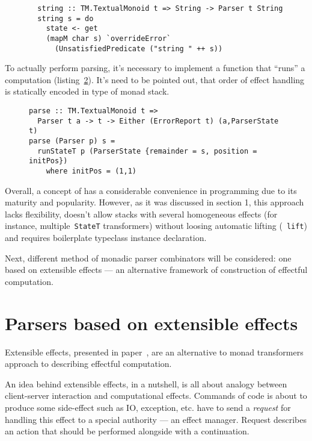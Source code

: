  \begin{figure}[h]
  \begin{lstlisting}
  string :: TM.TextualMonoid t => String -> Parser t String
  string s = do
    state <- get
    (mapM char s) `overrideError`
      (UnsatisfiedPredicate ("string " ++ s))
  \end{lstlisting}
  \caption{}
  \label{listing:mtlParserString}
  \end{figure}  

  To actually perform parsing, it's necessary to implement a function that 
  ``runs'' a computation (listing~\ref{listing:mtlParseRun}). It's need to be
  pointed out, that order of effect handling is statically encoded in type of 
  monad stack. 

  \begin{figure}[h]
  \begin{lstlisting}
parse :: TM.TextualMonoid t =>
  Parser t a -> t -> Either (ErrorReport t) (a,ParserState t)
parse (Parser p) s =
  runStateT p (ParserState {remainder = s, position = initPos})
    where initPos = (1,1)
  \end{lstlisting}
  \caption{}
  \label{listing:mtlParseRun}
  \end{figure}

  Overall, a concept of has a considerable convenience in programming due to 
  its maturity and popularity. However, as it was discussed in section 1, this 
  approach lacks flexibility, doesn't allow stacks with several homogeneous 
  effects (for instance, multiple~\lstinline{StateT} transformers) without 
  loosing automatic lifting (~\lstinline{lift}) and requires boilerplate 
  typeclass instance declaration.

  Next, different method of monadic parser combinators will be considered: one 
  based on extensible effects --- an alternative framework of construction of 
  effectful computation.

\section{Parsers based on extensible effects}

  Extensible effects, presented in paper~\cite{extEffects}, are an alternative 
  to monad transformers approach to describing effectful computation.

  An idea behind extensible effects, in a nutshell, is all about analogy between
  client-server interaction and computational effects. Commands of code is about 
  to produce some side-effect such as IO, exception, etc. have to send a 
  \emph{request} for handling this effect to a special authority --- an effect 
  manager. Request describes an action that should be performed alongside with 
  a continuation.

